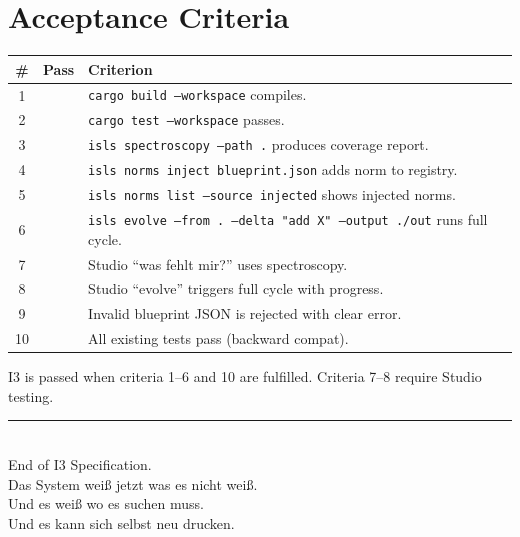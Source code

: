\documentclass[11pt,a4paper]{article}
\begin{document}
\section{Acceptance Criteria}

\begin{longtable}{clp{9cm}}
\toprule
\textbf{\#} & \textbf{Pass} & \textbf{Criterion} \\
\midrule
1 & & \texttt{cargo build --workspace} compiles. \\
2 & & \texttt{cargo test --workspace} passes. \\
3 & & \texttt{isls spectroscopy --path .} produces coverage report. \\
4 & & \texttt{isls norms inject blueprint.json} adds norm to registry. \\
5 & & \texttt{isls norms list --source injected} shows injected norms. \\
6 & & \texttt{isls evolve --from . --delta "add X" --output ./out} 
      runs full cycle. \\
7 & & Studio ``was fehlt mir?'' uses spectroscopy. \\
8 & & Studio ``evolve'' triggers full cycle with progress. \\
9 & & Invalid blueprint JSON is rejected with clear error. \\
10 & & All existing tests pass (backward compat). \\
\bottomrule
\end{longtable}

I3 is passed when criteria 1--6 and 10 are fulfilled. 
Criteria 7--8 require Studio testing.


\vfill
\begin{center}
\color{isls-gray}\rule{0.5\textwidth}{0.4pt}\\[0.5em]
{\small End of I3 Specification.\\[0.3em]
Das System wei{\ss} jetzt was es nicht wei{\ss}.\\
Und es wei{\ss} wo es suchen muss.\\
Und es kann sich selbst neu drucken.}
\end{center}
\end{document}
